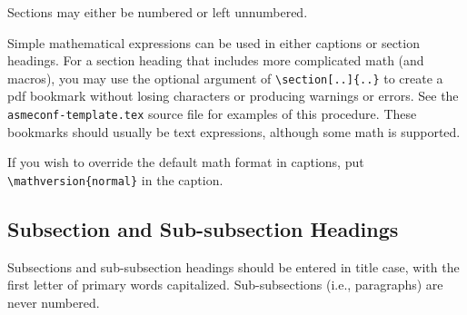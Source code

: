 \documentclass[varvw,largesc,upint,mathalfa=cal=euler,hyphenate,balance,lang-second=french,lang=english,colorlinks]{asmeconf} %
\begin{document}
Sections may either be numbered or left unnumbered.

Simple mathematical expressions can be used in either captions or section headings. For a section heading that includes more complicated math (and macros), you may use the optional argument of \verb|\section[..]{..}| to create a pdf bookmark without losing characters or producing warnings or errors. See the \texttt{asmeconf-template.tex} source file for examples of this procedure. These bookmarks should usually be text expressions, although some math is supported.  

If you wish to override the default math format in captions, put \verb|\mathversion{normal}| in the caption.

\subsection{Subsection and Sub-subsection Headings}
Subsections and sub-subsection headings should be entered in title case, with the first letter of primary words capitalized. Sub-subsections (i.e., paragraphs) are never numbered.




\begin{table}[t]
\caption[Table]{A simple table\label{tab:1}}
\end{table}


\end{document}
